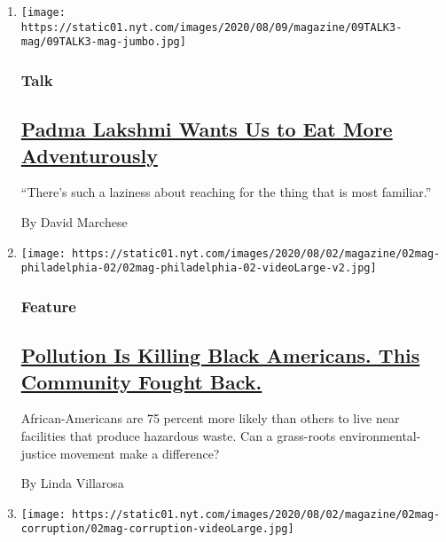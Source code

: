 \begin{enumerate}
\def\labelenumi{\arabic{enumi}.}
\item
  \texttt{[image: https://static01.nyt.com/images/2020/08/09/magazine/09TALK3-mag/09TALK3-mag-jumbo.jpg]}

  \hypertarget{talk}{%
  \subsubsection{Talk}\label{talk}}

  \hypertarget{padma-lakshmi-wants-us-to-eat-more-adventurously}{%
  \subsection{\texorpdfstring{\href{/interactive/2020/08/03/magazine/padma-lakshmi-interview.html}{Padma
  Lakshmi Wants Us to Eat More
  Adventurously}}{Padma Lakshmi Wants Us to Eat More Adventurously}}\label{padma-lakshmi-wants-us-to-eat-more-adventurously}}

  ``There's such a laziness about reaching for the thing that is most
  familiar.''

  By David Marchese
\item
  \texttt{[image: https://static01.nyt.com/images/2020/08/02/magazine/02mag-philadelphia-02/02mag-philadelphia-02-videoLarge-v2.jpg]}

  \hypertarget{feature}{%
  \subsubsection{Feature}\label{feature}}

  \hypertarget{pollution-is-killing-black-americans-this-community-fought-back}{%
  \subsection{\texorpdfstring{\href{/2020/07/28/magazine/pollution-philadelphia-black-americans.html}{Pollution
  Is Killing Black Americans. This Community Fought
  Back.}}{Pollution Is Killing Black Americans. This Community Fought Back.}}\label{pollution-is-killing-black-americans-this-community-fought-back}}

  African-Americans are 75 percent more likely than others to live near
  facilities that produce hazardous waste. Can a grass-roots
  environmental-justice movement make a difference?

  By Linda Villarosa
\item
  \texttt{[image: https://static01.nyt.com/images/2020/08/02/magazine/02mag-corruption/02mag-corruption-videoLarge.jpg]}


\end{enumerate}
